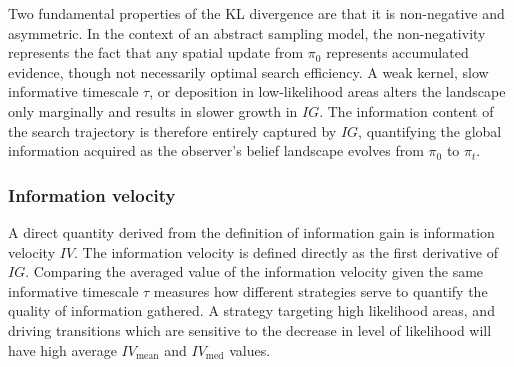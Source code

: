 Two fundamental properties of the KL divergence are that it is non-negative and asymmetric. In the context of an abstract sampling model, the non-negativity represents the fact that any spatial update from $\pi_0$ represents accumulated evidence, though not necessarily optimal search efficiency. A weak kernel, slow informative timescale $\tau$, or deposition in low-likelihood areas alters the landscape only marginally and results in slower growth in $IG$. The information content of the search trajectory is therefore entirely captured by $IG$, quantifying the global information acquired as the observer's belief landscape evolves from $\pi_0$ to $\pi_t$.
\subsubsection*{Information velocity}
A direct quantity derived from the definition of information gain is information velocity $IV$. The information velocity is defined directly as the first derivative of $IG$. Comparing the averaged value of the information velocity given the same informative timescale $\tau$ measures how different strategies serve to quantify the quality of information gathered. A strategy targeting high likelihood areas, and driving transitions which are sensitive to the decrease in level of likelihood will have high average $IV_{\text{mean}}$ and $IV_{\text{med}}$ values.
